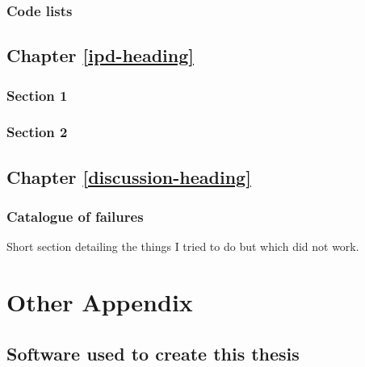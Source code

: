 \documentclass[a4paper, twoside]{templates/ociamthesis}
\begin{document}
\hypertarget{code-lists}{%
\subsection{Code lists}\label{code-lists}}

\hypertarget{appendix-ipd-analysis}{%
\section{Chapter \ref{ipd-heading}}\label{appendix-ipd-analysis}}

\hypertarget{section-1}{%
\subsection{Section 1}\label{section-1}}

\hypertarget{section-2}{%
\subsection{Section 2}\label{section-2}}

\hypertarget{chapter-refdiscussion-heading}{%
\section{Chapter \ref{discussion-heading}}\label{chapter-refdiscussion-heading}}

\hypertarget{catalogue-of-failures}{%
\subsection{Catalogue of failures}\label{catalogue-of-failures}}

Short section detailing the things I tried to do but which did not work.

\hypertarget{other-appendix-heading}{%
\chapter{Other Appendix}\label{other-appendix-heading}}

\hypertarget{software-used-to-create-this-thesis}{%
\section{Software used to create this thesis}\label{software-used-to-create-this-thesis}}
\end{document}

